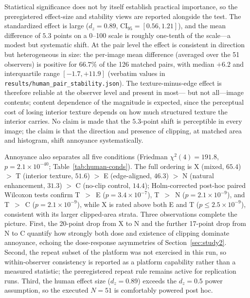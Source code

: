 \documentclass[5p,times,twocolumn]{elsarticle}
\begin{document}
Statistical significance does not by itself establish practical
importance, so the preregistered effect-size and stability views are
reported alongside the test. The standardized effect is large
($d_z = 0.89$, $\mathrm{CI}_{95} = [0.56, 1.21]$), and the mean difference
of $5.3$ points on a 0--100 scale is roughly one-tenth of the scale---a
modest but systematic shift. At the pair level the effect is consistent in
direction but heterogeneous in size: the per-image mean difference
(averaged over the 51 observers) is positive for $66.7\%$ of the 126
matched pairs, with median $+6.2$ and interquartile range
$[-1.7, +11.9]$ (verbatim values in
\texttt{results/human\_pair\_stability.json}). The texture-minus-edge
effect is therefore reliable at the observer level and present in most---
but not all---image contents; content dependence of the magnitude is
expected, since the perceptual cost of losing interior texture depends on
how much structured texture the interior carries. No claim is made that
the $5.3$-point shift is perceptible in every image; the claim is that the
direction and presence of clipping, at matched area and histogram, shift
annoyance systematically.

Annoyance also separates all five conditions (Friedman
$\chi^2(4) = 191.8$, $p = 2.1 \times 10^{-40}$; Table~\ref{tab:human-conds}).
The full ordering is X (mixed, $65.4$) $>$ T (interior texture, $51.6$)
$>$ E (edge-aligned, $46.3$) $>$ N (natural enhancement, $31.3$) $>$ C
(no-clip control, $14.4$); Holm-corrected post-hoc paired
Wilcoxon tests confirm T~$>$~E ($p = 3.4 \times 10^{-7}$), T~$>$~N
($p = 2.1 \times 10^{-9}$), and T~$>$~C ($p = 2.1 \times 10^{-9}$), while
X is rated above both E and T ($p \le 2.5 \times 10^{-9}$), consistent with
its larger clipped-area strata. Three observations complete the picture.
First, the 20-point drop from X to N and the further 17-point drop from N to
C quantify how strongly both dose and existence of clipping dominate
annoyance, echoing the dose-response asymmetries of Section~\ref{sec:study2}.
Second, the repeat subset of the platform was not exercised in this run, so
within-observer consistency is reported as a platform capability rather than
a measured statistic; the preregistered repeat rule remains active for
replication runs. Third, the human effect size ($d_z = 0.89$) exceeds the
$d_z = 0.5$ power assumption, so the executed $N = 51$ is comfortably
powered post hoc.
\end{document}
